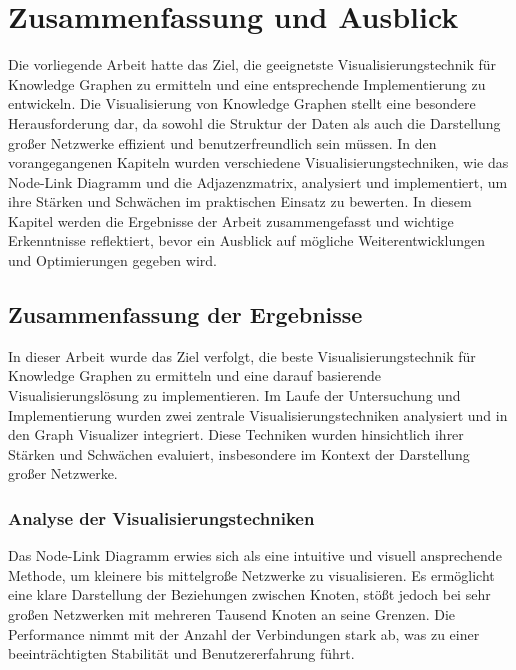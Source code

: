
\chapter{Zusammenfassung und Ausblick}

Die vorliegende Arbeit hatte das Ziel, die geeignetste Visualisierungstechnik für Knowledge Graphen zu ermitteln und eine entsprechende Implementierung zu entwickeln. Die Visualisierung von Knowledge Graphen stellt eine besondere Herausforderung dar, da sowohl die Struktur der Daten als auch die Darstellung großer Netzwerke effizient und benutzerfreundlich sein müssen. In den vorangegangenen Kapiteln wurden verschiedene Visualisierungstechniken, wie das Node-Link Diagramm und die Adjazenzmatrix, analysiert und implementiert, um ihre Stärken und Schwächen im praktischen Einsatz zu bewerten. In diesem Kapitel werden die Ergebnisse der Arbeit zusammengefasst und wichtige Erkenntnisse reflektiert, bevor ein Ausblick auf mögliche Weiterentwicklungen und Optimierungen gegeben wird.

\section{Zusammenfassung der Ergebnisse}

In dieser Arbeit wurde das Ziel verfolgt, die beste Visualisierungstechnik für Knowledge Graphen zu ermitteln und eine darauf basierende Visualisierungslösung zu implementieren. Im Laufe der Untersuchung und Implementierung wurden zwei zentrale Visualisierungstechniken analysiert und in den Graph Visualizer integriert. Diese Techniken wurden hinsichtlich ihrer Stärken und Schwächen evaluiert, insbesondere im Kontext der Darstellung großer Netzwerke.

\subsection{Analyse der Visualisierungstechniken}

Das Node-Link Diagramm erwies sich als eine intuitive und visuell ansprechende Methode, um kleinere bis mittelgroße Netzwerke zu visualisieren. Es ermöglicht eine klare Darstellung der Beziehungen zwischen Knoten, stößt jedoch bei sehr großen Netzwerken mit mehreren Tausend Knoten an seine Grenzen. Die Performance nimmt mit der Anzahl der Verbindungen stark ab, was zu einer beeinträchtigten Stabilität und Benutzererfahrung führt.

